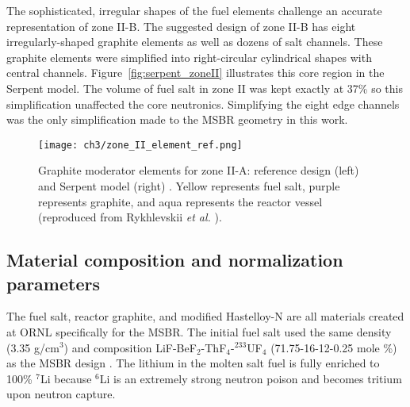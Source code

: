 The sophisticated, irregular shapes of the fuel elements challenge an accurate 
representation of zone II-B. The suggested design 
\cite{robertson_conceptual_1971} of zone II-B has eight irregularly-shaped 
graphite elements as well as dozens of salt channels. These graphite elements 
were simplified into right-circular cylindrical shapes with central channels. 
Figure~\ref{fig:serpent_zoneII} illustrates this core region in the Serpent 
model. The volume of fuel salt in zone II was kept exactly at 37\% so 
this simplification unaffected the core neutronics. 
Simplifying the eight edge channels was the only simplification made to the 
\gls{MSBR} geometry in this work. 
\begin{figure}[ht!] %
	\texttt{[image: ch3/zone\_II\_element\_ref.png]}
	\caption{Graphite moderator elements for zone II-A: reference design (left)
		\cite{robertson_conceptual_1971} and Serpent model (right) 
		\cite{rykhlevskii_full-core_2017}.  Yellow 
		represents fuel salt, purple represents graphite, and aqua represents 
		the reactor vessel (reproduced from Rykhlevskii \emph{et al.} 
		\cite{rykhlevskii_modeling_2019}).}
	\label{fig:II_element_ref}
\end{figure}

\subsection{Material composition and normalization parameters}
The fuel salt, reactor graphite, and modified Hastelloy-N are all materials 
created at \gls{ORNL} specifically for the \gls{MSBR}. The initial fuel salt 
used the same density (3.35 g/cm$^3$) and composition  
LiF-BeF$_2$-ThF$_4$-$^{233}$UF$_4$ (71.75-16-12-0.25 mole \%) as the 
\gls{MSBR} design \cite{robertson_conceptual_1971}. The lithium in the molten 
salt fuel is fully enriched to 100\% $^{7}$Li because $^{6}$Li is an extremely 
strong neutron poison and becomes tritium upon neutron capture. 

